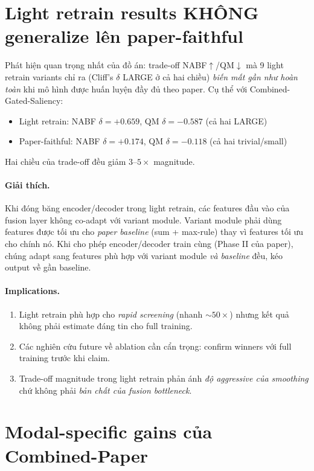 \section{Light retrain results KHÔNG generalize lên paper-faithful}
\label{sec:disc-key}

Phát hiện quan trọng nhất của đồ án: trade-off NABF$\uparrow$/QM$\downarrow$ mà 9 light retrain variants chỉ ra (Cliff's $\delta$ LARGE ở cả hai chiều) \emph{biến mất gần như hoàn toàn} khi mô hình được huấn luyện đầy đủ theo paper. Cụ thể với Combined-Gated-Saliency:
\begin{itemize}
    \item Light retrain: NABF $\delta=+0.659$, QM $\delta=-0.587$ (cả hai LARGE)
    \item Paper-faithful: NABF $\delta=+0.174$, QM $\delta=-0.118$ (cả hai trivial/small)
\end{itemize}

Hai chiều của trade-off đều giảm $3\text{--}5\times$ magnitude.

\paragraph{Giải thích.}
Khi đóng băng encoder/decoder trong light retrain, các features đầu vào của fusion layer không co-adapt với variant module. Variant module phải dùng features được tối ưu cho \emph{paper baseline} (sum + max-rule) thay vì features tối ưu cho chính nó. Khi cho phép encoder/decoder train cùng (Phase II của paper), chúng adapt sang features phù hợp với variant module \emph{và baseline} đều, kéo output về gần baseline.

\paragraph{Implications.}
\begin{enumerate}
    \item Light retrain phù hợp cho \emph{rapid screening} (nhanh $\sim 50\times$) nhưng kết quả không phải estimate đáng tin cho full training.
    \item Các nghiên cứu future về ablation cần cẩn trọng: confirm winners với full training trước khi claim.
    \item Trade-off magnitude trong light retrain phản ánh \emph{độ aggressive của smoothing} chứ không phải \emph{bản chất của fusion bottleneck}.
\end{enumerate}

\section{Modal-specific gains của Combined-Paper}
\label{sec:disc-modal}

